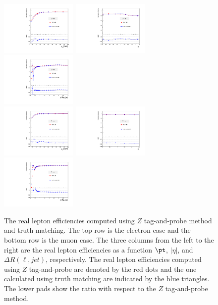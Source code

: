\begin{figure}[htbp]
\includegraphics[width=0.33\textwidth]{Compare_TandP_truth_match_electron_pt.pdf}
\includegraphics[width=0.33\textwidth]{Compare_TandP_truth_match_electron_eta.pdf}
\includegraphics[width=0.33\textwidth]{Compare_TandP_truth_match_electron_dRjet.pdf}\\
\includegraphics[width=0.33\textwidth]{Compare_TandP_truth_match_muon_pt.pdf}
\includegraphics[width=0.33\textwidth]{Compare_TandP_truth_match_muon_eta.pdf}
\includegraphics[width=0.33\textwidth]{Compare_TandP_truth_match_muon_dRjet.pdf}
\caption{
The real lepton efficiencies computed using $Z$ tag-and-probe method and truth matching.
The top row is the electron case and the bottom row is the muon case.
The three columns from the left to the right are the real lepton efficiencies as a function $\pt$, $|\eta|$, and $\Delta R(\ell, jet)$, respectively.
The real lepton efficiencies computed using $Z$ tag-and-probe are denoted by the red dots and the one calculated using truth matching are indicated by the blue triangles.
The lower pads show the ratio with respect to the $Z$ tag-and-probe method.
}
\label{fig:RLE_TandP_truth_match_comparisons}
\end{figure}
